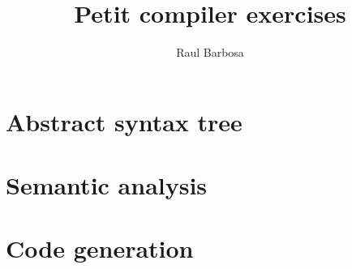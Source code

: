 \documentclass{paper}
\begin{document}
\title{Petit compiler exercises}
\author{Raul Barbosa}
\maketitle

\section{Abstract syntax tree}


\section{Semantic analysis}


\section{Code generation}

\end{document}
